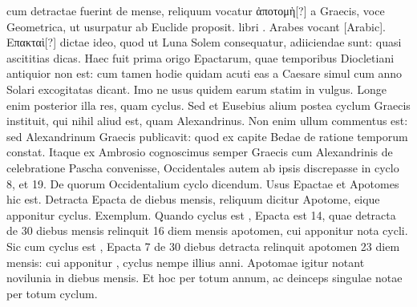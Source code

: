 cum detractae fuerint de mense, reliquum vocatur
 \textgreek{ἀποτομὴ[?]} a Graecis,
voce Geometrica, ut usurpatur ab Euclide proposit.
 libri
.
Arabes vocant \textarabic{}[Arabic].
\textgreek{Επακταὶ[?]} dictae ideo, quod ut Luna Solem
consequatur, adiiciendae sunt: quasi ascititias dicas.
Haec fuit
prima origo Epactarum, quae temporibus Diocletiani antiquior
non est: cum tamen hodie quidam acuti eas a Caesare simul cum anno
Solari excogitatas dicant.
Imo ne usus quidem earum statim in vulgus.
Longe enim posterior illa res, %
 quam cyclus.
Sed et Eusebius
alium postea cyclum Graecis instituit, qui nihil aliud est, quam Alexandrinus.
%
Non enim ullum commentus est: sed Alexandrinum Graecis
publicavit: quod ex  capite Bedae de ratione temporum
constat.
Itaque ex Ambrosio cognoscimus semper Graecis cum Alexandrinis
de celebratione Pascha convenisse, Occidentales autem ab
ipsis discrepasse in cyclo 8, et 19.
De quorum Occidentalium cyclo
dicendum.
Usus Epactae et Apotomes hic est.
Detracta Epacta de
diebus mensis, reliquum dicitur Apotome, eique apponitur cyclus.
Exemplum.
Quando cyclus est , Epacta est 14, quae detracta de
30 diebus mensis relinquit 16 diem mensis apotomen, cui apponitur
 nota cycli.
Sic cum cyclus est , Epacta 7 de 30 diebus detracta
relinquit apotomen 23 diem mensis: cui apponitur , cyclus
nempe illius anni.
Apotomae igitur notant novilunia in diebus mensis.
Et hoc per totum annum, ac deinceps singulae notae per totum
cyclum.
\vspace*{\fill}
%
